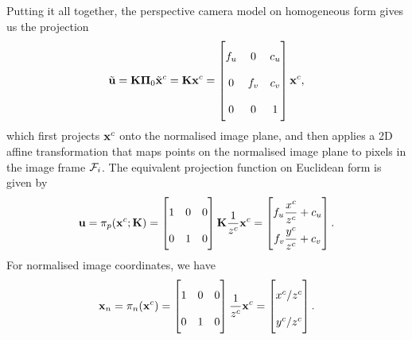 Putting it all together, the perspective camera model on homogeneous form gives us the projection
\begin{equation}
  \tilde{\vecu} = \matK \matPi_0 \tilde{\vecx}^c = \matK \vecx^c =
  \begin{bmatrix}
    f_u & 0 & c_u\\
    0 & f_v & c_v\\
    0 & 0 & 1
  \end{bmatrix}
  \vecx^c,
\end{equation}
which first projects ${\boldsymbol{\mathbf{x}}}^c$ onto the normalised image plane, and then applies a 2D affine transformation that maps points on the normalised image plane to pixels in the image frame $\mathcal{F}_i$.
The equivalent projection function on Euclidean form is given by
\begin{equation} \label{eq:projection-function}
  \vecu = \pi_p(\vecx^c; \matK) =
  \begin{bmatrix}
    1 & 0 & 0 \\
    0 & 1 & 0 \\
  \end{bmatrix}
  \matK \frac{1}{z^c} \vecx^c =
  \renewcommand\arraystretch{2}
  \begin{bmatrix}
    f_u \dfrac{x^c}{z^c} + c_u\\
    f_v \dfrac{y^c}{z^c} + c_v \\
  \end{bmatrix}.
\end{equation}
For normalised image coordinates, we have
\begin{equation} \label{eq:normalised-projection-function}
  \vecx_n = \pi_n(\vecx^c) =
  \begin{bmatrix}
    1 & 0 & 0 \\
    0 & 1 & 0 \\
  \end{bmatrix}
  \frac{1}{z^c} \vecx^c =
  \begin{bmatrix}
    x^c / z^c\\
    y^c / z^c \\
  \end{bmatrix}.
\end{equation}

